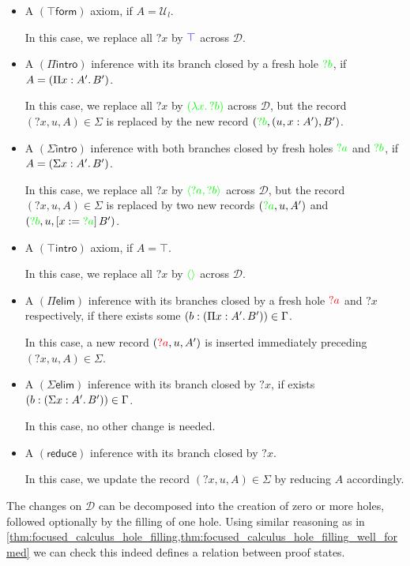 \documentclass[twoside]{report}
\begin{document}
\begin{definition}
\begin{itemize}
        \item A $(\top\mathsf{form})$ axiom, if $A = \mathcal U_l$.\par
              In this case, we replace all ${?x}$ by $\textcolor{blue}{\top}$ across $\mathcal D$.

        \item A $(\Pi\mathsf{intro})$ inference with its branch closed by a fresh hole $\textcolor{green}{?b}$, if $A = (\Pi{x} : {A'}.\,{B'})$.\par
              In this case, we replace all ${?x}$ by $\textcolor{green}{(\lambda{x}.\,{?b})}$ across $\mathcal D$, but the record $({?x}, u, A) \in \Sigma$ is replaced by the new record $(\textcolor{green}{?b}, (u, x : {A'}), {B'})$.

        \item A $(\Sigma\mathsf{intro})$ inference with both branches closed by fresh holes $\textcolor{green}{?a}$ and $\textcolor{green}{?b}$, if $A = (\Sigma{x} : {A'}.\,{B'})$.\par
              In this case, we replace all ${?x}$ by $\textcolor{green}{\langle{?a}, {?b}\rangle}$ across $\mathcal D$, but the record $({?x}, u, A) \in \Sigma$ is replaced by two new records $(\textcolor{green}{?a}, u, {A'})$ and $(\textcolor{green}{?b}, u, [{x}:={\textcolor{green}{?a}}]\,{B'})$.

        \item A $(\top\mathsf{intro})$ axiom, if $A = \top$.\par
              In this case, we replace all ${?x}$ by $\textcolor{green}{\langle\rangle}$ across $\mathcal D$.

        \item A $(\Pi\mathsf{elim})$ inference with its branches closed by a fresh hole $\textcolor{red}{?a}$ and ${?x}$ respectively, if there exists some $(b : (\Pi{x} : {A'}.\,{B'})) \in \Gamma$.\par
              In this case, a new record $(\textcolor{red}{?a}, u, A')$ is inserted immediately preceding $({?x}, u, A) \in \Sigma$.

        \item A $(\Sigma\mathsf{elim})$ inference with its branch closed by ${?x}$, if exists $(b : (\Sigma{x} : {A'}.\,{B'})) \in \Gamma$.\par
              In this case, no other change is needed.

        \item A $(\mathsf{reduce})$ inference with its branch closed by ${?x}$.\par
              In this case, we update the record $({?x}, u, A) \in \Sigma$ by reducing $A$ accordingly.
    \end{itemize}
    The changes on $\mathcal D$ can be decomposed into the creation of zero or more holes, followed optionally by the filling of one hole. Using similar reasoning as in \cref{thm:focused_calculus_hole_filling,thm:focused_calculus_hole_filling_well_formed} we can check this indeed defines a relation between proof states.
\end{definition}
\end{document}
